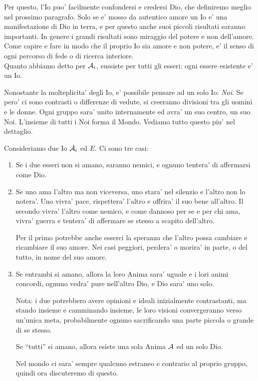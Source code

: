     Per questo, l'Io puo' facilmente confondersi e credersi Dio, che definiremo meglio nel prossimo paragrafo. Solo se e' mosso da autentico amore un Io e' una manifestazione di Dio in terra, e per questo anche suoi piccoli risultati saranno importanti. In genere i grandi risultati sono miraggio del potere e non dell'amore. Come capire e fare in modo che il proprio Io sia amore e non potere, e' il senso di ogni percorso di fede o di ricerca interiore. \\

    Quanto abbiamo detto per $\mathcal{A}_i$, sussiste per tutti gli esseri: ogni essere esistente e' un Io.

    Nonostante la molteplicita' degli Io, e' possibile pensare ad un solo Io: \emph{Noi}. Se pero' ci sono contrasti o differenze di vedute, si creeranno divisioni tra gli uomini e le donne. Ogni gruppo sara' unito internamente ed avra' un suo centro, un suo Noi. L'insieme di tutti i Noi forma il Mondo. Vediamo tutto questo piu' nel dettaglio.

    Consideriamo due Io $\mathcal{A}_i$ ed $E$. Ci sono tre casi:

    \begin{enumerate}

        \item Se i due esseri non si amano, saranno nemici, e ognuno tentera' di affermarsi come Dio.

        \item Se uno ama l'altro ma non viceversa, uno stara' nel silenzio e l'altro non lo notera'. Uno vivra' pace, rispettera' l'altro e offrira' il suo bene all'altro. Il secondo vivra' l'altro come nemico, e come dannoso per se e per chi ama, vivra' guerra e tentera' di affermare se stesso a scapito dell'altro.
            
            Per il primo potrebbe anche esserci la speranza che l'altro possa cambiare e ricambiare il suo amore. Nei casi peggiori, perdera' o morira' in parte, o del tutto, in nome del suo amore.

        \item Se entrambi si amano, allora la loro Anima sara' uguale e i lori animi concordi, ognuno vedra' pure nell'altro Dio, e Dio sara' uno solo.

                Nota: i due potrebbero avere opinioni e ideali inizialmente contrastanti, ma stando insieme e camminando insieme, le loro visioni convergeranno verso un'unica meta, probabilmente ognuno sacrificando una parte piccola o grande di se stesso.

                Se ``tutti'' si amano, allora esiste una sola Anima $\mathcal{A}$ ed un solo Dio.

                Nel mondo ci sara' sempre qualcuno estraneo e contrario al proprio gruppo, quindi ora discuteremo di questo.
    \end{enumerate}

